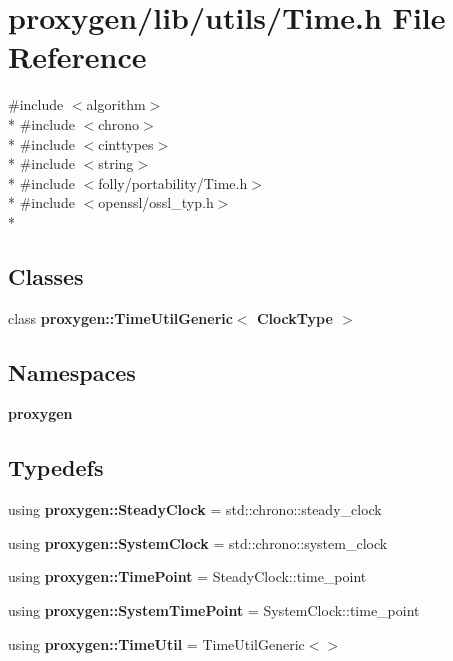 \section{proxygen/lib/utils/\+Time.h File Reference}
\label{Time_8h}
{\ttfamily \#include $<$algorithm$>$}\\*
{\ttfamily \#include $<$chrono$>$}\\*
{\ttfamily \#include $<$cinttypes$>$}\\*
{\ttfamily \#include $<$string$>$}\\*
{\ttfamily \#include $<$folly/portability/\+Time.\+h$>$}\\*
{\ttfamily \#include $<$openssl/ossl\+\_\+typ.\+h$>$}\\*
\subsection*{Classes}
\begin{DoxyCompactItemize}
\item 
class {\bf proxygen\+::\+Time\+Util\+Generic$<$ Clock\+Type $>$}
\end{DoxyCompactItemize}
\subsection*{Namespaces}
\begin{DoxyCompactItemize}
\item 
 {\bf proxygen}
\end{DoxyCompactItemize}
\subsection*{Typedefs}
\begin{DoxyCompactItemize}
\item 
using {\bf proxygen\+::\+Steady\+Clock} = std\+::chrono\+::steady\+\_\+clock
\item 
using {\bf proxygen\+::\+System\+Clock} = std\+::chrono\+::system\+\_\+clock
\item 
using {\bf proxygen\+::\+Time\+Point} = Steady\+Clock\+::time\+\_\+point
\item 
using {\bf proxygen\+::\+System\+Time\+Point} = System\+Clock\+::time\+\_\+point
\item 
using {\bf proxygen\+::\+Time\+Util} = Time\+Util\+Generic$<$$>$
\end{DoxyCompactItemize}
